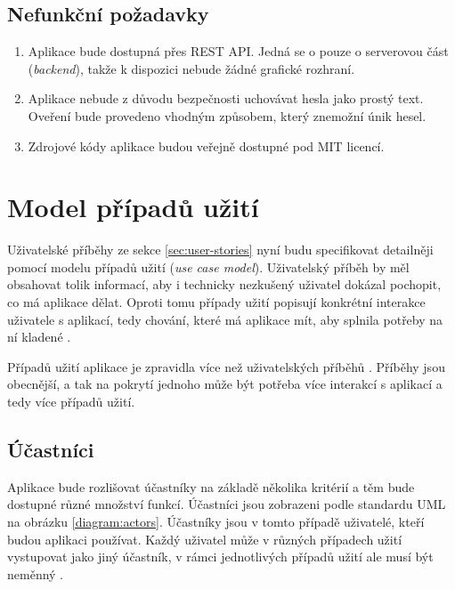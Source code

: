 \documentclass[thesis=B,czech]{FITthesis}[2012/06/26]
\begin{document}
		\subsection{Nefunkční požadavky}
		\begin{enumerate}
			\item Aplikace bude dostupná přes REST API. Jedná se o pouze o serverovou část (\textit{backend}), takže k dispozici nebude žádné grafické rozhraní.
			
			\item Aplikace nebude z důvodu bezpečnosti uchovávat hesla jako prostý text. Oveření bude provedeno vhodným způsobem, který znemožní únik hesel.
			
			\item Zdrojové kódy aplikace budou veřejně dostupné pod MIT licencí.
		\end{enumerate}
		
	\section{Model případů užití}
		Uživatelské příběhy ze sekce \ref{sec:user-stories} nyní budu specifikovat detailněji pomocí modelu případů užití (\textit{use case model}). Uživatelský příběh by měl obsahovat tolik informací, aby i technicky nezkušený uživatel dokázal pochopit, co má aplikace dělat. Oproti tomu případy užití popisují konkrétní interakce uživatele s aplikací, tedy chování, které má aplikace mít, aby splnila potřeby na ní kladené \cite{user-stories-vs-use-cases}.
		
		Případů užití aplikace je zpravidla více než uživatelských příběhů \cite{si-usecases}. Příběhy jsou obecnější, a tak na pokrytí jednoho může být potřeba více interakcí s aplikací a tedy více případů užití.
		
		\subsection{Účastníci}
			Aplikace bude rozlišovat účastníky na základě několika kritérií a těm bude dostupné různé množství funkcí. Účastníci jsou zobrazeni podle standardu UML na obrázku \ref{diagram:actors}.
			Účastníky jsou v tomto případě uživatelé, kteří budou aplikaci používat. Každý uživatel může v různých případech užití vystupovat jako jiný účastník, v rámci jednotlivých případů užití ale musí být neměnný \cite{uml-unified-process}.
			
\end{document}
